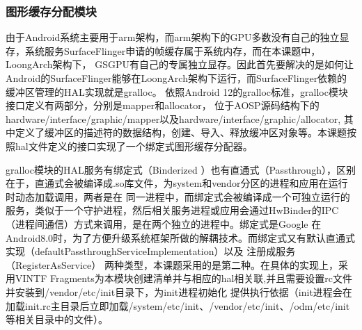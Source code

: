 








\subsubsection{图形缓存分配模块}
由于Android系统主要用于arm架构，而arm架构下的GPU多数没有自己的独立显存，系统服务SurfaceFlinger申请的帧缓存属于系统内存，而在本课题中，LoongArch架构下，
GSGPU有自己的专属独立显存。因此首先要解决的是如何让Android的SurfaceFlinger能够在LoongArch架构下运行，而SurfaceFlinger依赖的缓冲区管理的HAL实现就是gralloc。
依照Android 12的gralloc标准，gralloc模块接口定义有两部分，分别是mapper和allocator，
位于AOSP源码结构下的hardware/interface/graphic/mapper以及hardware/interface/graphic/allocator,
其中定义了缓冲区的描述符的数据结构，创建、导入、释放缓冲区对象等。本课题按照hal文件定义的接口实现了一个绑定式图形缓存分配器。

gralloc模块的HAL服务有绑定式（Binderized ）也有直通式（Passthrough），区别在于，直通式会被编译成.so库文件，为system和vendor分区的进程和应用在运行时动态加载调用，两者是在
同一进程中，而绑定式会被编译成一个可独立运行的服务，类似于一个守护进程，然后相关服务进程或应用会通过HwBinder的IPC（进程间通信）方式来调用，是在两个独立的进程中。绑定式是Google
在Android8.0时，为了方便升级系统框架所做的解耦技术。而绑定式又有默认直通式实现（defaultPassthroughServiceImplementation）以及 注册成服务（RegisterAsService）
两种类型，本课题采用的是第二种。在具体的实现上，采用VINTF Fragments为本模块创建清单并与相应的hal相关联,并且需要设置rc文件并安装到/vendor/etc/init目录下，为init进程初始化
提供执行依据（init进程会在加载init.rc主目录后立即加载/system/etc/init、/vendor/etc/init、/odm/etc/init等相关目录中的文件）。

